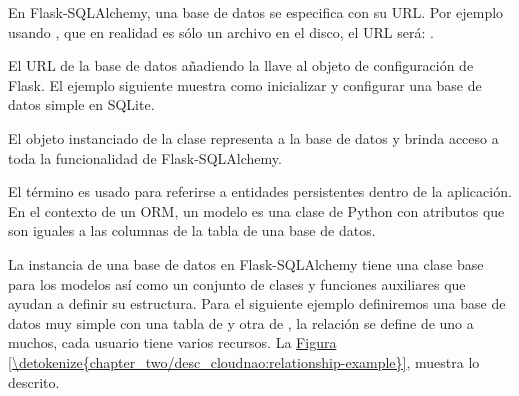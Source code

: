 En Flask-SQLAlchemy, una base de datos se especifica con su URL. Por ejemplo
usando , que en realidad es sólo un archivo en el disco, el URL
será: .

El URL de la base de datos añadiendo la llave  al
objeto de configuración de Flask. El ejemplo siguiente muestra como inicializar
y configurar una base de datos simple en SQLite.

\begin{sphinxVerbatim}[commandchars=\\\{\}]
   
  
\PYG{p}{[}\PYG{p}{]} \PYGZbs{}
  
\end{sphinxVerbatim}

El objeto  instanciado de la clase  representa a la base
de datos y brinda acceso a toda la funcionalidad de Flask-SQLAlchemy.


El término  es usado para referirse a entidades persistentes dentro de la
aplicación. En el contexto de un ORM, un modelo es una clase de Python con
atributos que son iguales a las columnas de la tabla de una base de datos.

La instancia de una base de datos en Flask-SQLAlchemy tiene una clase base
para los modelos así como un conjunto de clases y funciones auxiliares que
ayudan a definir su estructura. Para el siguiente ejemplo definiremos una
base de datos muy simple con una tabla de  y otra de ,
la relación se define de uno a muchos, cada usuario tiene varios recursos.
La \hyperref[\detokenize{chapter_two/desc_cloudnao:relationship-example}]{Figura \ref{\detokenize{chapter_two/desc_cloudnao:relationship-example}}}, muestra lo descrito.

